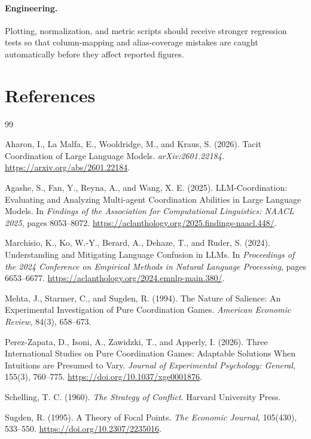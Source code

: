 \documentclass[11pt]{article}
\begin{document}
\paragraph{Engineering.}
Plotting, normalization, and metric scripts should receive stronger regression tests so that column-mapping and alias-coverage mistakes are caught automatically before they affect reported figures.

\section{References}

\begin{thebibliography}{99}

Aharon, I., La Malfa, E., Wooldridge, M., and Kraus, S. (2026).
\newblock Tacit Coordination of Large Language Models.
\newblock \textit{arXiv:2601.22184}.
\newblock \url{https://arxiv.org/abs/2601.22184}.

Agashe, S., Fan, Y., Reyna, A., and Wang, X. E. (2025).
\newblock LLM-Coordination: Evaluating and Analyzing Multi-agent Coordination Abilities in Large Language Models.
\newblock In \textit{Findings of the Association for Computational Linguistics: NAACL 2025}, pages 8053--8072.
\newblock \url{https://aclanthology.org/2025.findings-naacl.448/}.

Marchisio, K., Ko, W.-Y., Berard, A., Dehaze, T., and Ruder, S. (2024).
\newblock Understanding and Mitigating Language Confusion in LLMs.
\newblock In \textit{Proceedings of the 2024 Conference on Empirical Methods in Natural Language Processing}, pages 6653--6677.
\newblock \url{https://aclanthology.org/2024.emnlp-main.380/}.

Mehta, J., Starmer, C., and Sugden, R. (1994).
\newblock The Nature of Salience: An Experimental Investigation of Pure Coordination Games.
\newblock \textit{American Economic Review}, 84(3), 658--673.

Perez-Zapata, D., Isoni, A., Zawidzki, T., and Apperly, I. (2026).
\newblock Three International Studies on Pure Coordination Games: Adaptable Solutions When Intuitions are Presumed to Vary.
\newblock \textit{Journal of Experimental Psychology: General}, 155(3), 760--775.
\newblock \url{https://doi.org/10.1037/xge0001876}.

Schelling, T. C. (1960).
\newblock \textit{The Strategy of Conflict}.
\newblock Harvard University Press.

Sugden, R. (1995).
\newblock A Theory of Focal Points.
\newblock \textit{The Economic Journal}, 105(430), 533--550.
\newblock \url{https://doi.org/10.2307/2235016}.

\end{thebibliography}
\end{document}

